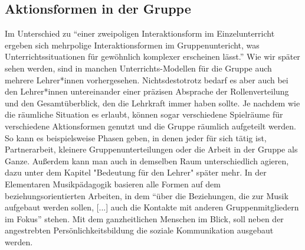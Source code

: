 \subsection{Aktionsformen in der Gruppe}
Im Unterschied zu \enquote{einer zweipoligen Interaktionsform im Einzelunterricht ergeben sich
mehrpolige Interaktionsformen im Gruppenuntericht, was Unterrichtssituationen
für gewöhnlich komplexer erscheinen lässt.}
\autocite[30]{losert:die_kunst_zu_unterrichten} Wie wir später sehen werden,
sind in manchen Unterrichts-Modellen für die Gruppe auch mehrere Lehrer*innen vorhergesehen.
Nichtsdestotrotz bedarf es aber auch bei den Lehrer*innen untereinander einer
präzisen Absprache der Rollenverteilung und den Gesamtüberblick, den die Lehrkraft
immer haben sollte. Je nachdem wie die räumliche Situation es erlaubt, können
sogar verschiedene Spielräume für verschiedene Aktionsformen genutzt und die
Gruppe räumlich aufgeteilt werden. So kann es beispielsweise Phasen geben, in
denen jeder für sich tätig ist, Partnerarbeit, kleinere Gruppenunterteilungen
oder die Arbeit in der Gruppe als Ganze. Außerdem kann man auch in demselben
Raum unterschiedlich agieren, dazu unter dem Kapitel "Bedeutung für den Lehrer"
später mehr. In der Elementaren Musikpädagogik basieren alle Formen auf dem
beziehungsorientierten Arbeiten, in dem \enquote{über die Beziehungen, die zur
Musik aufgebaut werden sollen, [...] auch die Kontakte mit anderen
Gruppenmitgliedern im Fokus} \autocite[10]{dartsch:kern_des_musizierens} stehen.
Mit dem ganzheitlichen Menschen im Blick, soll neben der angestrebten
Persönlichkeitsbildung die soziale Kommunikation ausgebaut werden.
